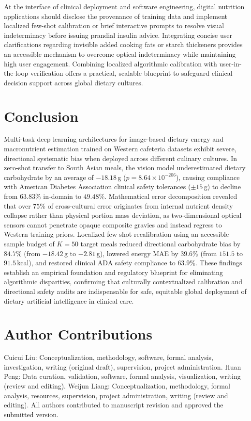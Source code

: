 \documentclass[utf8]{FrontiersinVancouver}
\begin{document}
At the interface of clinical deployment and software engineering, digital nutrition applications should disclose the provenance of training data and implement localized few-shot calibration or brief interactive prompts to resolve visual indeterminacy before issuing prandial insulin advice. Integrating concise user clarifications regarding invisible added cooking fats or starch thickeners provides an accessible mechanism to overcome optical indeterminacy while maintaining high user engagement. Combining localized algorithmic calibration with user-in-the-loop verification offers a practical, scalable blueprint to safeguard clinical decision support across global dietary cultures.

\section{Conclusion}

Multi-task deep learning architectures for image-based dietary energy and macronutrient estimation trained on Western cafeteria datasets exhibit severe, directional systematic bias when deployed across different culinary cultures. In zero-shot transfer to South Asian meals, the vision model underestimated dietary carbohydrate by an average of $-18.18$\,g ($p = 8.64 \times 10^{-206}$), causing compliance with American Diabetes Association clinical safety tolerances ($\pm 15$\,g) to decline from $63.83\%$ in-domain to $49.48\%$. Mathematical error decomposition revealed that over $75\%$ of cross-cultural error originates from internal nutrient density collapse rather than physical portion mass deviation, as two-dimensional optical sensors cannot penetrate opaque composite gravies and instead regress to Western training priors. Localized few-shot recalibration using an accessible sample budget of $K=50$ target meals reduced directional carbohydrate bias by $84.7\%$ (from $-18.42$\,g to $-2.81$\,g), lowered energy MAE by $39.6\%$ (from $151.5$ to $91.5$\,kcal), and restored clinical ADA safety compliance to $63.9\%$. These findings establish an empirical foundation and regulatory blueprint for eliminating algorithmic disparities, confirming that culturally contextualized calibration and directional safety audits are indispensable for safe, equitable global deployment of dietary artificial intelligence in clinical care.

\section*{Author Contributions}
Cuicui Liu: Conceptualization, methodology, software, formal analysis, investigation, writing (original draft), supervision, project administration. Huan Peng: Data curation, validation, software, formal analysis, visualization, writing (review and editing). Weijun Liang: Conceptualization, methodology, formal analysis, resources, supervision, project administration, writing (review and editing). All authors contributed to manuscript revision and approved the submitted version.
\end{document}

